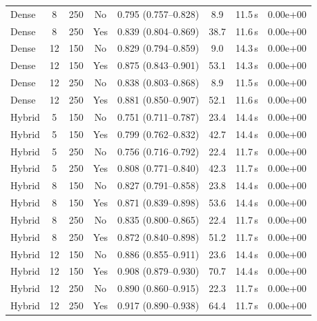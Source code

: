 \begin{table}[ht]
\begin{tabular}{lccclccc}
Dense & 8 & 250 & No & 0.795 (0.757--0.828) & 8.9 & 11.5\,s & 0.00e+00 \\
Dense & 8 & 250 & Yes & 0.839 (0.804--0.869) & 38.7 & 11.6\,s & 0.00e+00 \\
Dense & 12 & 150 & No & 0.829 (0.794--0.859) & 9.0 & 14.3\,s & 0.00e+00 \\
Dense & 12 & 150 & Yes & 0.875 (0.843--0.901) & 53.1 & 14.3\,s & 0.00e+00 \\
Dense & 12 & 250 & No & 0.838 (0.803--0.868) & 8.9 & 11.5\,s & 0.00e+00 \\
Dense & 12 & 250 & Yes & 0.881 (0.850--0.907) & 52.1 & 11.6\,s & 0.00e+00 \\
\midrule
Hybrid & 5 & 150 & No & 0.751 (0.711--0.787) & 23.4 & 14.4\,s & 0.00e+00 \\
Hybrid & 5 & 150 & Yes & 0.799 (0.762--0.832) & 42.7 & 14.4\,s & 0.00e+00 \\
Hybrid & 5 & 250 & No & 0.756 (0.716--0.792) & 22.4 & 11.7\,s & 0.00e+00 \\
Hybrid & 5 & 250 & Yes & 0.808 (0.771--0.840) & 42.3 & 11.7\,s & 0.00e+00 \\
Hybrid & 8 & 150 & No & 0.827 (0.791--0.858) & 23.8 & 14.4\,s & 0.00e+00 \\
Hybrid & 8 & 150 & Yes & 0.871 (0.839--0.898) & 53.6 & 14.4\,s & 0.00e+00 \\
Hybrid & 8 & 250 & No & 0.835 (0.800--0.865) & 22.4 & 11.7\,s & 0.00e+00 \\
Hybrid & 8 & 250 & Yes & 0.872 (0.840--0.898) & 51.2 & 11.7\,s & 0.00e+00 \\
Hybrid & 12 & 150 & No & 0.886 (0.855--0.911) & 23.6 & 14.4\,s & 0.00e+00 \\
Hybrid & 12 & 150 & Yes & 0.908 (0.879--0.930) & 70.7 & 14.4\,s & 0.00e+00 \\
Hybrid & 12 & 250 & No & 0.890 (0.860--0.915) & 22.3 & 11.7\,s & 0.00e+00 \\
Hybrid & 12 & 250 & Yes & 0.917 (0.890--0.938) & 64.4 & 11.7\,s & 0.00e+00 \\
\bottomrule
\end{tabular}
\end{table}
